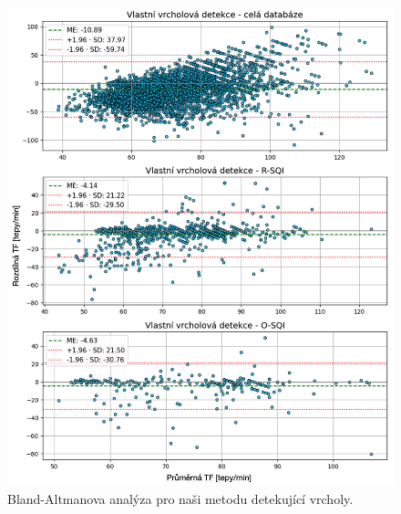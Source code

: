 \begin{figure}[!ht]
	\centering
	\includegraphics[width=1\textwidth]{./obrazky/vysledky/BA_BUT_VVD.png}
	\caption[Bland-Altmanova analýza pro naši metodu detekující vrcholy - BUT PPG]{Bland-Altmanova analýza pro naši metodu detekující vrcholy.}
	\label{fig:BUT_BlandAltman_vvd}
\end{figure}

